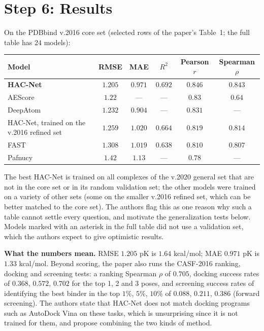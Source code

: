 \documentclass[11pt]{article}
\begin{document}
\section{Step 6: Results}
On the PDBbind v.2016 core set (selected rows of the paper's Table~1; the full table has $24$ models):

\begin{center}
\small
\begin{tabular}{@{}lccccc@{}}
\toprule
Model & RMSE & MAE & $R^2$ & Pearson $r$ & Spearman $\rho$\\
\midrule
\textbf{HAC-Net} & $\mathbf{1.205}$ & $0.971$ & $0.692$ & $0.846$ & $0.843$\\
AEScore & $1.22$ & --- & --- & $0.83$ & $0.64$\\
DeepAtom & $1.232$ & $0.904$ & --- & $0.831$ & ---\\
HAC-Net, trained on the v.2016 refined set & $1.259$ & $1.020$ & $0.664$ & $0.819$ & $0.814$\\
FAST & $1.308$ & $1.019$ & $0.638$ & $0.810$ & $0.807$\\
Pafnucy & $1.42$ & $1.13$ & --- & $0.78$ & ---\\
\bottomrule
\end{tabular}
\end{center}

The best HAC-Net is trained on all complexes of the v.2020 general set that are not in the core set or in its random validation set; the other models were trained on a variety of other sets (some on the smaller v.2016 refined set, which can be better matched to the core set). The authors flag this as one reason why such a table cannot settle every question, and motivate the generalization tests below. Models marked with an asterisk in the full table did not use a validation set, which the authors expect to give optimistic results.

\textbf{What the numbers mean.} RMSE $1.205$ pK is $1.64$ kcal/mol; MAE $0.971$ pK is $1.33$ kcal/mol. Beyond scoring, the paper also runs the CASF-2016 ranking, docking and screening tests: a ranking Spearman $\rho$ of $0.705$, docking success rates of $0.368$, $0.572$, $0.702$ for the top 1, 2 and 3 poses, and screening success rates of identifying the best binder in the top $1\%$, $5\%$, $10\%$ of $0.088$, $0.211$, $0.386$ (forward screening). The authors state that HAC-Net does not match docking programs such as AutoDock Vina on these tasks, which is unsurprising since it is not trained for them, and propose combining the two kinds of method.
\end{document}

